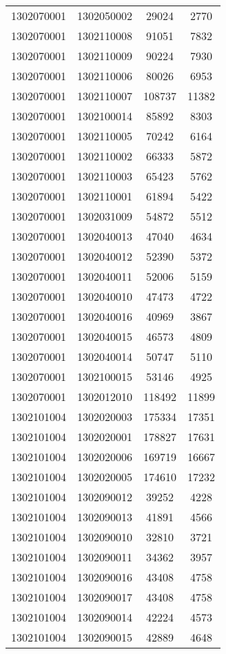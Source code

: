 \begin{longtable}[h]{llcc}
		1302070001 & 1302050002 & 29024 & 2770\\
		1302070001 & 1302110008 & 91051 & 7832\\
		1302070001 & 1302110009 & 90224 & 7930\\
		1302070001 & 1302110006 & 80026 & 6953\\
		1302070001 & 1302110007 & 108737 & 11382\\
		1302070001 & 1302100014 & 85892 & 8303\\
		1302070001 & 1302110005 & 70242 & 6164\\
		1302070001 & 1302110002 & 66333 & 5872\\
		1302070001 & 1302110003 & 65423 & 5762\\
		1302070001 & 1302110001 & 61894 & 5422\\
		1302070001 & 1302031009 & 54872 & 5512\\
		1302070001 & 1302040013 & 47040 & 4634\\
		1302070001 & 1302040012 & 52390 & 5372\\
		1302070001 & 1302040011 & 52006 & 5159\\
		1302070001 & 1302040010 & 47473 & 4722\\
		1302070001 & 1302040016 & 40969 & 3867\\
		1302070001 & 1302040015 & 46573 & 4809\\
		1302070001 & 1302040014 & 50747 & 5110\\
		1302070001 & 1302100015 & 53146 & 4925\\
		1302070001 & 1302012010 & 118492 & 11899\\
		1302101004 & 1302020003 & 175334 & 17351\\
		1302101004 & 1302020001 & 178827 & 17631\\
		1302101004 & 1302020006 & 169719 & 16667\\
		1302101004 & 1302020005 & 174610 & 17232\\
		1302101004 & 1302090012 & 39252 & 4228\\
		1302101004 & 1302090013 & 41891 & 4566\\
		1302101004 & 1302090010 & 32810 & 3721\\
		1302101004 & 1302090011 & 34362 & 3957\\
		1302101004 & 1302090016 & 43408 & 4758\\
		1302101004 & 1302090017 & 43408 & 4758\\
		1302101004 & 1302090014 & 42224 & 4573\\
		1302101004 & 1302090015 & 42889 & 4648\\

\end{longtable}
